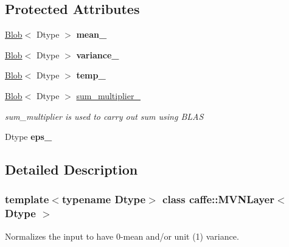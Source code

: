 \subsection*{Protected Attributes}
\begin{DoxyCompactItemize}
\item 
\mbox{\label{classcaffe_1_1_m_v_n_layer_a759e8d43de78abc594ac00ab638b0e04}} 
\mbox{\hyperlink{classcaffe_1_1_blob}{Blob}}$<$ Dtype $>$ {\bfseries mean\+\_\+}
\item 
\mbox{\label{classcaffe_1_1_m_v_n_layer_a8888bb097cae81f701a6d69cdaa15610}} 
\mbox{\hyperlink{classcaffe_1_1_blob}{Blob}}$<$ Dtype $>$ {\bfseries variance\+\_\+}
\item 
\mbox{\label{classcaffe_1_1_m_v_n_layer_a3a0ccb267413e296077c889dff469d58}} 
\mbox{\hyperlink{classcaffe_1_1_blob}{Blob}}$<$ Dtype $>$ {\bfseries temp\+\_\+}
\item 
\mbox{\label{classcaffe_1_1_m_v_n_layer_a69609a88e80bdeb5eaa345eeb5b0a585}} 
\mbox{\hyperlink{classcaffe_1_1_blob}{Blob}}$<$ Dtype $>$ \mbox{\hyperlink{classcaffe_1_1_m_v_n_layer_a69609a88e80bdeb5eaa345eeb5b0a585}{sum\+\_\+multiplier\+\_\+}}
\begin{DoxyCompactList}\small\item\em sum\+\_\+multiplier is used to carry out sum using B\+L\+AS \end{DoxyCompactList}\item 
\mbox{\label{classcaffe_1_1_m_v_n_layer_a76c620f1b61ffcc8bca0e733bc5bb29c}} 
Dtype {\bfseries eps\+\_\+}
\end{DoxyCompactItemize}


\subsection{Detailed Description}
\subsubsection*{template$<$typename Dtype$>$\newline
class caffe\+::\+M\+V\+N\+Layer$<$ Dtype $>$}

Normalizes the input to have 0-\/mean and/or unit (1) variance. 

